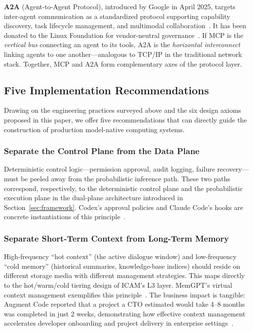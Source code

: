 \documentclass[11pt,a4paper]{article}
\newcounter{axiom}[section]
\begin{document}
\textbf{A2A} (Agent-to-Agent Protocol), introduced by Google in April 2025, targets inter-agent communication as a standardized protocol supporting capability discovery, task lifecycle management, and multimodal collaboration~\cite{google_a2a_2025,agentprotocols2025}. It has been donated to the Linux Foundation for vendor-neutral governance~\cite{a2alinux2025}. If MCP is the \textit{vertical bus} connecting an agent to its tools, A2A is the \textit{horizontal interconnect} linking agents to one another---analogous to TCP/IP in the traditional network stack. Together, MCP and A2A form complementary axes of the protocol layer.

\subsection{Five Implementation Recommendations}
\label{sec:impl-recommendations}

Drawing on the engineering practices surveyed above and the six design axioms proposed in this paper, we offer five recommendations that can directly guide the construction of production model-native computing systems.

\subsubsection{Separate the Control Plane from the Data Plane}

Deterministic control logic---permission approval, audit logging, failure recovery---must be peeled away from the probabilistic inference path. These two paths correspond, respectively, to the deterministic control plane and the probabilistic execution plane in the dual-plane architecture introduced in Section~\ref{sec:framework}. Codex's approval policies and Claude Code's hooks are concrete instantiations of this principle~\cite{openai_codex_approvals_2026,anthropic_claudecode_security_2026}.

\subsubsection{Separate Short-Term Context from Long-Term Memory}

High-frequency ``hot context'' (the active dialogue window) and low-frequency ``cold memory'' (historical summaries, knowledge-base indices) should reside on different storage media with different management strategies. This maps directly to the hot/warm/cold tiering design of ICAM's L3 layer. MemGPT's virtual context management exemplifies this principle~\cite{memgpt2023}. The business impact is tangible: Augment Code reported that a project a CTO estimated would take 4--8 months was completed in just 2 weeks, demonstrating how effective context management accelerates developer onboarding and project delivery in enterprise settings~\cite{anthropic2026agenticreport}.
\end{document}
